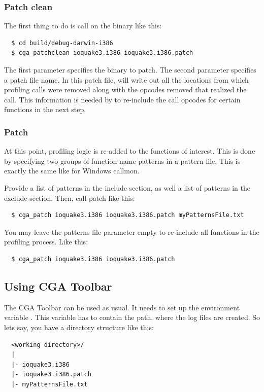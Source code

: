 \subsubsection{Patch clean} The first thing to do is call  on the binary like this:
\begin{verbatim}
  $ cd build/debug-darwin-i386
  $ cga_patchclean ioquake3.i386 ioquake3.i386.patch
\end{verbatim}
The first parameter specifies the binary to patch. The second parameter specifies a patch file name. In this patch file,  will write out all the locations from which profiling calls were removed along with the opcodes removed that realized the call. This information is needed by  to re-include the call opcodes for certain functions in the next step.

\subsubsection{Patch} At this point, profiling logic is re-added to the functions of interest. This is done by specifying two groups of function name patterns in a pattern file. This is exactly the same like for Windows callmon.

Provide a list of patterns in the include section, as well a list of patterns in the exclude section. Then, call patch like this:

\begin{verbatim}
  $ cga_patch ioquake3.i386 ioquake3.i386.patch myPatternsFile.txt
\end{verbatim}

You may leave the patterns file parameter empty to re-include all functions in the profiling process. Like this:

\begin{verbatim}
  $ cga_patch ioquake3.i386 ioquake3.i386.patch
\end{verbatim}

\subsection{Using CGA Toolbar}

The CGA Toolbar can be used as usual. It needs to set up the environment variable . This variable has to contain the path, where the log files are created. So lets say, you have a directory structure like this:

\begin{verbatim}
  <working directory>/
  |
  |- ioquake3.i386
  |- ioquake3.i386.patch
  |- myPatternsFile.txt
\end{verbatim}

